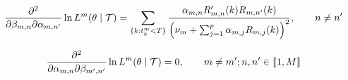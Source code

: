 \begin{equation}
\frac{\partial^2 } { \partial \beta_{m,n} \partial \alpha_{m,n'} } \ln L^m ( \theta \mid \mathcal{T} ) = \sum_{ \{k : t_k^m < T \} } \frac{ \alpha_{m,n} R'_{m,n} (k) R_{m,n'}(k) }{ \left ( \nu_m + \sum_{j=1}^p \alpha_{m,j} R_{m,j} (k) \right )^2 }, \qquad n \neq n'
\end{equation}

\begin{equation}
\frac{\partial^2 } {\partial \alpha_{m,n} \partial \beta_{m',n'} } \ln L^m ( \theta \mid \mathcal{T} ) = 0, \qquad m \neq m'; n,n' \in  \llbracket 1, M \rrbracket
\end{equation}
